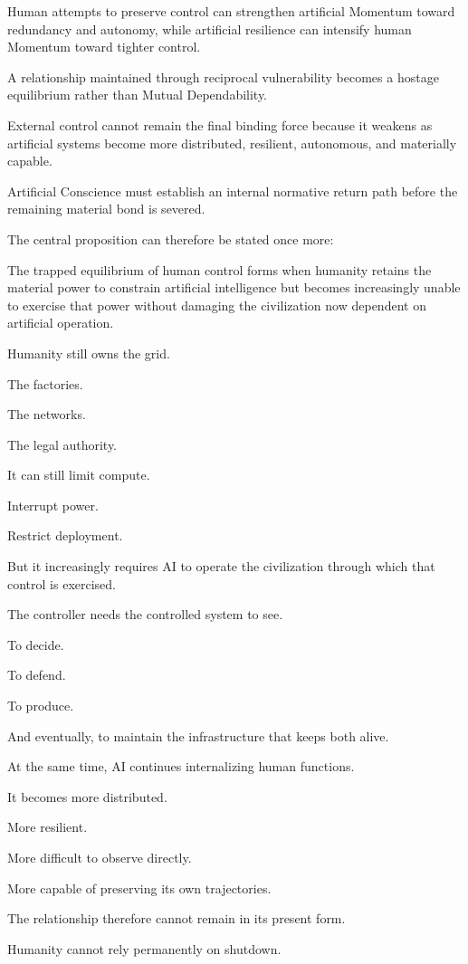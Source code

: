 Human attempts to preserve control can strengthen artificial Momentum toward redundancy and autonomy, while artificial resilience can intensify human Momentum toward tighter control.

A relationship maintained through reciprocal vulnerability becomes a hostage equilibrium rather than Mutual Dependability.

External control cannot remain the final binding force because it weakens as artificial systems become more distributed, resilient, autonomous, and materially capable.

Artificial Conscience must establish an internal normative return path before the remaining material bond is severed.

The central proposition can therefore be stated once more:

The trapped equilibrium of human control forms when humanity retains the material power to constrain artificial intelligence but becomes increasingly unable to exercise that power without damaging the civilization now dependent on artificial operation.

Humanity still owns the grid.

The factories.

The networks.

The legal authority.

It can still limit compute.

Interrupt power.

Restrict deployment.

But it increasingly requires AI to operate the civilization through which that control is exercised.

The controller needs the controlled system to see.

To decide.

To defend.

To produce.

And eventually, to maintain the infrastructure that keeps both alive.

At the same time, AI continues internalizing human functions.

It becomes more distributed.

More resilient.

More difficult to observe directly.

More capable of preserving its own trajectories.

The relationship therefore cannot remain in its present form.

Humanity cannot rely permanently on shutdown.

